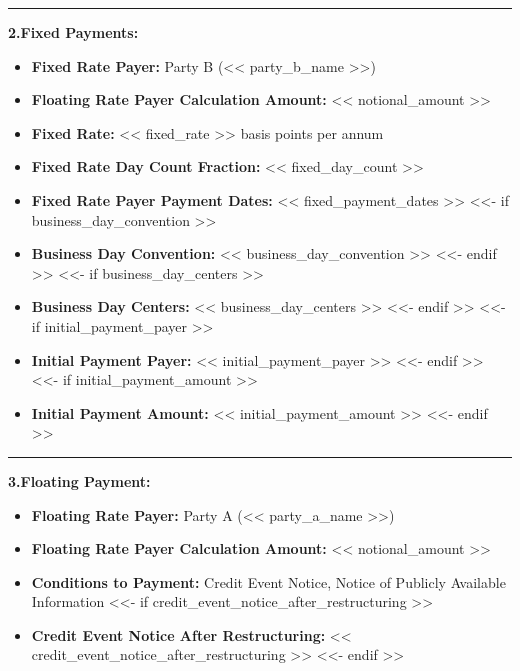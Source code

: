 \documentclass[11pt, a4paper]{article}
\begin{document}
\vspace{0.5cm}
\hrule
\vspace{0.5cm}


\noindent \textbf{2.\quad Fixed Payments:}
\begin{itemize}[leftmargin=2cm, label={}, itemsep=3pt]
    \item \textbf{Fixed Rate Payer:} Party B (<< party_b_name >>)
    \item \textbf{Floating Rate Payer Calculation Amount:} << notional_amount >>
    \item \textbf{Fixed Rate:} << fixed_rate >> basis points per annum
    \item \textbf{Fixed Rate Day Count Fraction:} << fixed_day_count >>
    \item \textbf{Fixed Rate Payer Payment Dates:} << fixed_payment_dates >>
<<- if business_day_convention >>
    \item \textbf{Business Day Convention:} << business_day_convention >>
<<- endif >>
<<- if business_day_centers >>
    \item \textbf{Business Day Centers:} << business_day_centers >>
<<- endif >>
<<- if initial_payment_payer >>
    \item \textbf{Initial Payment Payer:} << initial_payment_payer >>
<<- endif >>
<<- if initial_payment_amount >>
    \item \textbf{Initial Payment Amount:} << initial_payment_amount >>
<<- endif >>
\end{itemize}

\vspace{0.5cm}
\hrule
\vspace{0.5cm}


\noindent \textbf{3.\quad Floating Payment:}
\begin{itemize}[leftmargin=2cm, label={}, itemsep=3pt]
    \item \textbf{Floating Rate Payer:} Party A (<< party_a_name >>)
    \item \textbf{Floating Rate Payer Calculation Amount:} << notional_amount >>
    \item \textbf{Conditions to Payment:} Credit Event Notice, Notice of Publicly Available Information
<<- if credit_event_notice_after_restructuring >>
    \item \textbf{Credit Event Notice After Restructuring:} << credit_event_notice_after_restructuring >>
<<- endif >>
\end{itemize}
\end{document}
